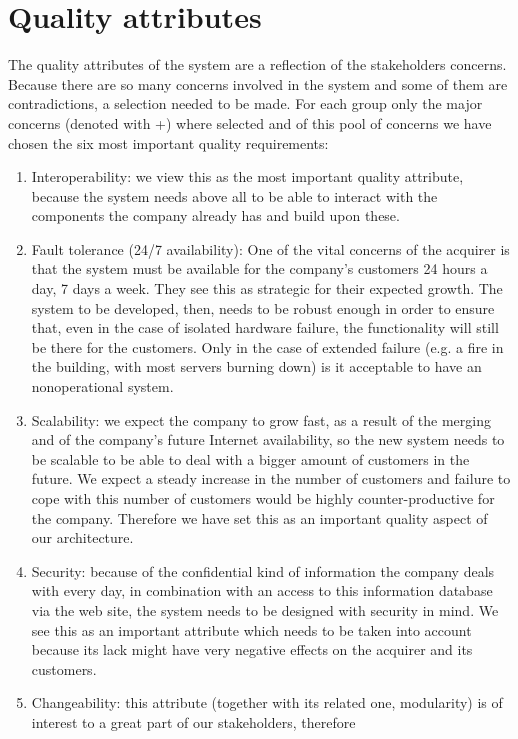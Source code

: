 \section{Quality attributes}
The quality attributes of the system are a reflection of the
stakeholders concerns. Because there are so many concerns involved
in the system and some of them are contradictions, a selection
needed to be made. For each group only the major concerns (denoted
with +) where selected and of this pool of concerns we have chosen
the six most important quality requirements:
\begin{enumerate}
\item Interoperability: we view this as the most important quality
attribute, because the system needs above all to be able to
interact with the components the company already has and build
upon these.
\item Fault tolerance (24/7 availability): One of the vital concerns
of the acquirer is that the system must be available for the company's
customers 24 hours a day, 7 days a week. They see this as strategic
for their expected growth. The system to be developed, then, needs
to be robust enough in order to ensure that, even in the case of
isolated hardware failure, the functionality will still be there for
the customers. Only in the case of extended failure (e.g. a fire in
the building, with most servers burning down) is it acceptable to
have an nonoperational system.
\item Scalability: we expect the company to grow fast, as a result
of the merging and of the company's future Internet availability,
so the new system needs to be scalable to be able to deal with a
bigger amount of customers in the future. We expect a steady increase
in the number of customers and failure to cope with this number
of customers would be highly counter-productive for the company.
Therefore we have set this as an important quality aspect of our
architecture.
\item Security: because of the confidential kind of information the
company deals with every day, in combination with an access to
this information database via the web site, the system needs to be
designed with security in mind. We see this as an important attribute
which needs to be taken into account because its lack might have
very negative effects on the acquirer and its customers.
\item Changeability: this attribute (together with its related one,
modularity) is of interest to a great part of our stakeholders, therefore

\end{enumerate}
